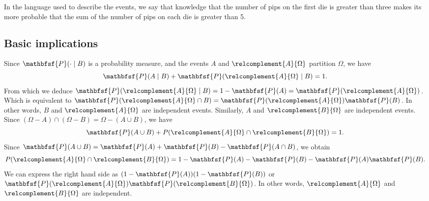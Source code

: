 In the language used to describe the events, we say that knowledge that the number of pips on the first die is greater than three makes its more probable that the sum of the number of pips on each die is greater than 5.

\subsection*{Basic implications}

Since $\mathbfsf{P} (\cdot \mid  B)$ is a probability measure, and the events $A$ and $\relcomplement{A}{\Omega }$ partition $\Omega $, we have
    \[
\mathbfsf{P} (A \mid  B) + \mathbfsf{P} (\relcomplement{A}{\Omega } \mid  B) = 1.
    \]
From which we deduce $\mathbfsf{P} (\relcomplement{A}{\Omega } \mid B) = 1 - \mathbfsf{P} (A) = \mathbfsf{P} (\relcomplement{A}{\Omega })$.
Which is equivalent to $\mathbfsf{P} (\relcomplement{A}{\Omega } \cap  B) = \mathbfsf{P} (\relcomplement{A}{\Omega })\mathbfsf{P} (B)$.
In other words, $B$ and $\relcomplement{A}{\Omega }$ are independent events.
Similarly, $A$ and $\relcomplement{B}{\Omega }$ are independent events.
Since $(\Omega  - A) \cap  (\Omega  - B) = \Omega  - (A \cup B)$, we have
    \[
\mathbfsf{P} (A \cup B) + P(\relcomplement{A}{\Omega } \cap \relcomplement{B}{\Omega }) = 1.
    \]
Since $\mathbfsf{P} (A \cup B) = \mathbfsf{P} (A) + \mathbfsf{P} (B) - \mathbfsf{P} (A \cap  B)$, we obtain
    \[
P(\relcomplement{A}{\Omega } \cap  \relcomplement{B}{\Omega }) = 1 - \mathbfsf{P} (A) - \mathbfsf{P} (B) - \mathbfsf{P} (A)\mathbfsf{P} (B).
    \]
We can express the right hand side as $(1 - \mathbfsf{P} (A))(1 - \mathbfsf{P} (B))$ or $\mathbfsf{P} (\relcomplement{A}{\Omega })\mathbfsf{P} (\relcomplement{B}{\Omega })$.
In other words, $\relcomplement{A}{\Omega }$ and $\relcomplement{B}{\Omega }$ are independent.
